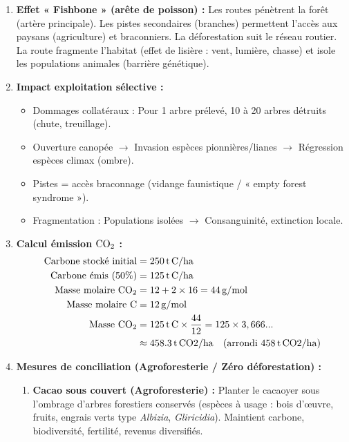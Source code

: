 \documentclass[11pt]{article}
\begin{document}
\begin{exoresolu}
\begin{enumerate}
        \item \textbf{Effet « Fishbone » (arête de poisson) :} Les routes pénètrent la forêt (artère principale). Les pistes secondaires (branches) permettent l'accès aux paysans (agriculture) et braconniers. La déforestation suit le réseau routier. La route fragmente l'habitat (effet de lisière : vent, lumière, chasse) et isole les populations animales (barrière génétique).
        \item \textbf{Impact exploitation sélective :}
              \begin{itemize}
                  \item Dommages collatéraux : Pour 1 arbre prélevé, 10 à 20 arbres détruits (chute, treuillage).
                  \item Ouverture canopée $\rightarrow$ Invasion espèces pionnières/lianes $\rightarrow$ Régression espèces climax (ombre).
                  \item Pistes = accès braconnage (vidange faunistique / « empty forest syndrome »).
                  \item Fragmentation : Populations isolées $\rightarrow$ Consanguinité, extinction locale.
              \end{itemize}
        \item \textbf{Calcul émission $\ce{CO2}$ :}
              \begin{align*}
                  \text{Carbone stocké initial} &= \SI{250}{t\,C/ha} \\
                  \text{Carbone émis (50\%)} &= \SI{125}{t\,C/ha} \\
                  \text{Masse molaire } \ce{CO2} &= 12 + 2\times 16 = \SI{44}{g/mol} \\
                  \text{Masse molaire C} &= \SI{12}{g/mol} \\
                  \text{Masse } \ce{CO2} &= \SI{125}{t\,C} \times \frac{44}{12} = 125 \times 3,666... \\
                  &\approx \mathbf{\SI{458,3}{t\,CO2/ha}} \quad (\text{arrondi } \SI{458}{t\,CO2/ha})
              \end{align*}
        \item \textbf{Mesures de conciliation (Agroforesterie / Zéro déforestation) :}
              \begin{enumerate}
                  \item \textbf{Cacao sous couvert (Agroforesterie) :} Planter le cacaoyer sous l'ombrage d'arbres forestiers conservés (espèces à usage : bois d'œuvre, fruits, engrais verts type \emph{Albizia}, \emph{Gliricidia}). Maintient carbone, biodiversité, fertilité, revenus diversifiés.

\end{enumerate}
\end{enumerate}
\end{exoresolu}
\end{document}
